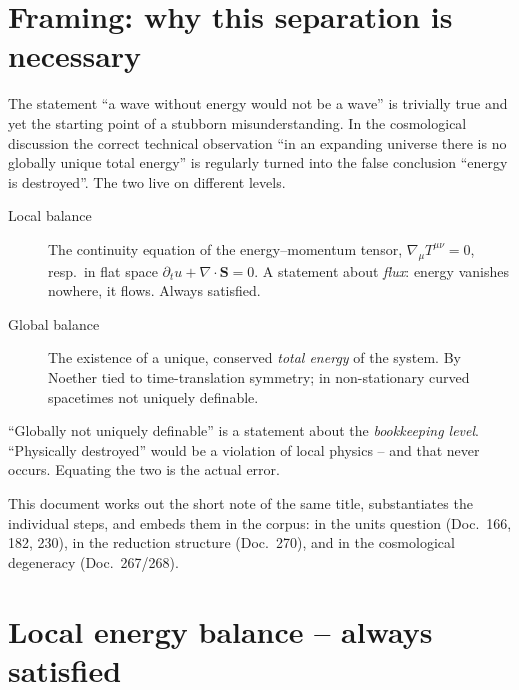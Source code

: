 \section{Framing: why this separation is necessary}

The statement \enquote{a wave without energy would not be a wave} is trivially
true and yet the starting point of a stubborn misunderstanding. In the
cosmological discussion the correct technical observation \enquote{in an
expanding universe there is no globally unique total energy} is regularly
turned into the false conclusion \enquote{energy is destroyed}. The two live on
different levels.

\begin{definition}\label{def:levels277}
\begin{description}
  \item[Local balance] The continuity equation of the energy--momentum tensor,
    $\nabla_\mu T^{\mu\nu}=0$, resp.\ in flat space
    $\partial_t u + \nabla\!\cdot\mathbf S = 0$. A statement about \emph{flux}:
    energy vanishes nowhere, it flows. Always satisfied.
  \item[Global balance] The existence of a unique, conserved \emph{total
    energy} of the system. By Noether tied to time-translation symmetry; in
    non-stationary curved spacetimes not uniquely definable.
\end{description}
\end{definition}

\begin{warnthm}
\enquote{Globally not uniquely definable} is a statement about the
\emph{bookkeeping level}. \enquote{Physically destroyed} would be a violation
of local physics -- and that never occurs. Equating the two is the actual
error.
\end{warnthm}

This document works out the short note of the same title, substantiates the
individual steps, and embeds them in the corpus: in the units question
(Doc.~166, 182, 230), in the reduction structure (Doc.~270), and in the
cosmological degeneracy (Doc.~267/268).

\section{Local energy balance -- always satisfied}

